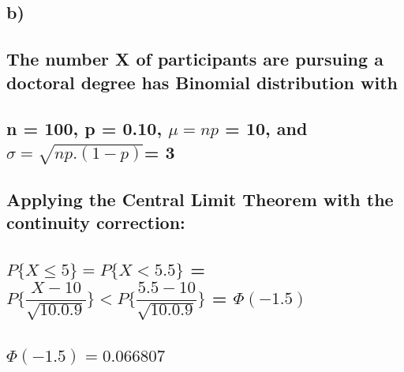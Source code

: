 \documentclass[12pt]{article}
\begin{document}
\subsection*{b)
\\\\ The number X of participants are pursuing a doctoral degree has Binomial distribution with
\\\\ n = 100, p = 0.10, $\mu = np$ = 10, and $ \sigma =\sqrt{np . (1 - p)} $= 3
\\\\Applying the Central Limit Theorem with the continuity correction: 
\\\\{\hspace*{50}}$P\{X \leq 5 \} = P\{X < 5.5\} $ = $P \{ \dfrac{X - 10}{\sqrt{10 . 0.9}}\} < P \{\dfrac{5.5-10}{\sqrt{10 . 0.9}}\}$ = $\Phi(-1.5)$
\\\\ {\hspace*{50}}$\Phi(-1.5) = 0.066807 $
}
\end{document}
